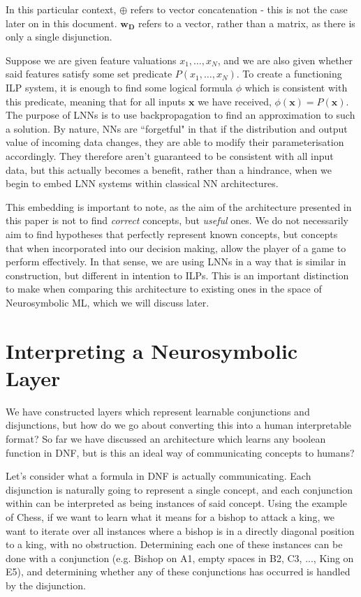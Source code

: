 \documentclass[conference]{report}
\begin{document}
In this particular context, $\oplus$ refers to vector concatenation - this is not the case later on in this document. $\mathbf{w_D}$ refers to a vector, rather than a matrix, as there is only a single disjunction.

Suppose we are given feature valuations $x_1, \dots, x_N$, and we are also given whether said features satisfy some set predicate $P(x_1, \dots, x_N)$. To create a functioning ILP system, it is enough to find some logical formula $\phi$ which is consistent with this predicate, meaning that for all inputs $\mathbf{x}$ we have received, $\phi(\mathbf{x}) = P(\mathbf{x})$. The purpose of LNNs is to use backpropagation to find an approximation to such a solution. By nature, NNs are ``forgetful" in that if the distribution and output value of incoming data changes, they are able to modify their parameterisation accordingly. They therefore aren't guaranteed to be consistent with all input data, but this actually becomes a benefit, rather than a hindrance, when we begin to embed LNN systems within classical NN architectures. 

This embedding is important to note, as the aim of the architecture presented in this paper is not to find \textit{correct} concepts, but \textit{useful} ones. We do not necessarily aim to find hypotheses that perfectly represent known concepts, but concepts that when incorporated into our decision making, allow the player of a game to perform effectively. In that sense, we are using LNNs in a way that is similar in construction, but different in intention to ILPs. This is an important distinction to make when comparing this architecture to existing ones in the space of Neurosymbolic ML, which we will discuss later.

\section{Interpreting a Neurosymbolic Layer}

We have constructed layers which represent learnable conjunctions and disjunctions, but how do we go about converting this into a human interpretable format? So far we have discussed an architecture which learns any boolean function in DNF, but is this an ideal way of communicating concepts to humans?

Let's consider what a formula in DNF is actually communicating. Each disjunction is naturally going to represent a single concept, and each conjunction within can be interpreted as being instances of said concept. Using the example of Chess, if we want to learn what it means for a bishop to attack a king, we want to iterate over all instances where a bishop is in a directly diagonal position to a king, with no obstruction. Determining each one of these instances can be done with a conjunction (e.g. Bishop on A1, empty spaces in B2, C3, ..., King on E5), and determining whether any of these conjunctions has occurred is handled by the disjunction. 
\end{document}
